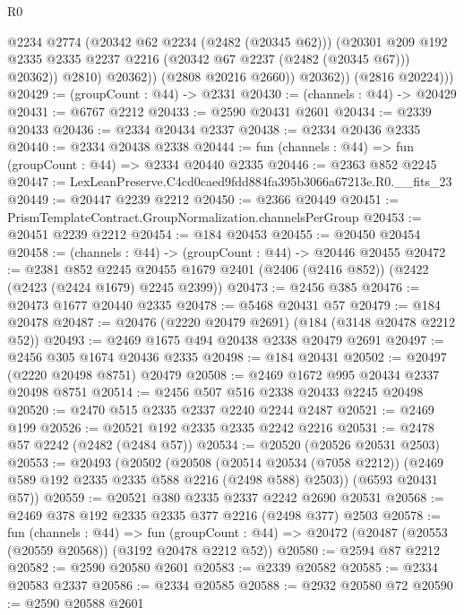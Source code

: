\begin{lexlean}{R0}
\begin{coremodule}
                      @2234
                      @2774
                      (@20342 @62 @2234 (@2482 (@20345 @62)))
                      (@20301
                        @209
                        @192
                        @2335
                        @2335
                        @2237
                        @2216
                        (@20342 @67 @2237 (@2482 (@20345 @67)))
                        @20362))
                    @2810)
                  @20362))
              (@2808 @20216 @2660))
            @20362))
        (@2816 @20224)))
@20429 := (groupCount : @44) -> @2331
@20430 := (channels : @44) -> @20429
@20431 := @6767 @2212
@20433 := @2590 @20431 @2601
@20434 := @2339 @20433
@20436 := @2334 @20434 @2337
@20438 := @2334 @20436 @2335
@20440 := @2334 @20438 @2338
@20444 := fun (channels : @44) => fun (groupCount : @44) => @2334 @20440 @2335
@20446 := @2363 @852 @2245
@20447 := LexLeanPreserve.C4cd0caed9fdd884fa395b3066a67213e.R0.__fits_23
@20449 := @20447 @2239 @2212
@20450 := @2366 @20449
@20451 := PrismTemplateContract.GroupNormalization.channelsPerGroup
@20453 := @20451 @2239 @2212
@20454 := @184 @20453
@20455 := @20450 @20454
@20458 := (channels : @44) -> (groupCount : @44) -> @20446 @20455
@20472 := @2381
    @852
    @2245
    @20455
    @1679
    @2401
    (@2406 (@2416 @852))
    (@2422 (@2423 (@2424 @1679) @2245 @2399))
@20473 := @2456 @385
@20476 := @20473 @1677 @20440 @2335
@20478 := @5468 @20431 @57
@20479 := @184 @20478
@20487 := @20476 (@2220 @20479 @2691) (@184 (@3148 @20478 @2212 @52))
@20493 := @2469 @1675 @494 @20438 @2338 @20479 @2691
@20497 := @2456 @305 @1674 @20436 @2335
@20498 := @184 @20431
@20502 := @20497 (@2220 @20498 @8751) @20479
@20508 := @2469 @1672 @995 @20434 @2337 @20498 @8751
@20514 := @2456 @507 @516 @2338 @20433 @2245 @20498
@20520 := @2470 @515 @2335 @2337 @2240 @2244 @2487
@20521 := @2469 @199
@20526 := @20521 @192 @2335 @2335 @2242 @2216
@20531 := @2478 @57 @2242 (@2482 (@2484 @57))
@20534 := @20520 (@20526 @20531 @2503)
@20553 := @20493
    (@20502
      (@20508
        (@20514 @20534 (@7058 @2212))
        (@2469 @589 @192 @2335 @2335 @588 @2216 (@2498 @588) @2503))
      (@6593 @20431 @57))
@20559 := @20521 @380 @2335 @2337 @2242 @2690 @20531
@20568 := @2469 @378 @192 @2335 @2335 @377 @2216 (@2498 @377) @2503
@20578 := fun (channels : @44) =>
  fun (groupCount : @44) => @20472 (@20487 (@20553 (@20559 @20568)) (@3192 @20478 @2212 @52))
@20580 := @2594 @87 @2212
@20582 := @2590 @20580 @2601
@20583 := @2339 @20582
@20585 := @2334 @20583 @2337
@20586 := @2334 @20585
@20588 := @2932 @20580 @72
@20590 := @2590 @20588 @2601

\end{coremodule}
\end{lexlean}
